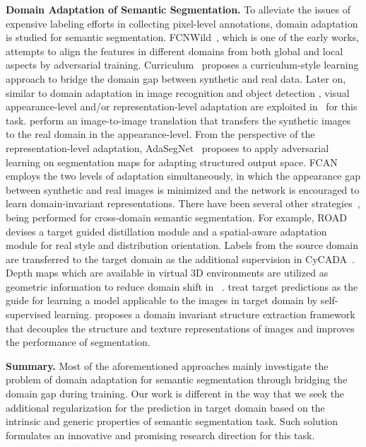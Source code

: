 \documentclass[10pt,twocolumn,letterpaper]{article}
\begin{document}
\textbf{Domain Adaptation of Semantic Segmentation.}
To alleviate the issues of expensive labeling efforts in collecting pixel-level annotations, domain adaptation is studied for semantic segmentation. FCNWild~\cite{BDDS_hoffman2016fcns}, which is one of the early works, attempts to align the features in different domains from both global and local aspects by adversarial training. Curriculum~\cite{zhang2017curriculum} proposes a curriculum-style learning approach to bridge the domain gap between synthetic and real data. Later on, similar to domain adaptation in image recognition and object detection \cite{cai2019exploring,pan2019transferrable,yao2015semi}, visual appearance-level and/or representation-level adaptation are exploited in~\cite{dundar2018domain,murez2018image,Tsai_2018_CVPR,Zhang_2018_CVPR} for this task. \cite{dundar2018domain,murez2018image} perform an image-to-image translation that transfers the synthetic images to the real domain in the appearance-level. From the perspective of the representation-level adaptation, AdaSegNet~\cite{Tsai_2018_CVPR} proposes to apply adversarial learning on segmentation maps for adapting structured output space.
FCAN~\cite{Zhang_2018_CVPR} employs the two levels of adaptation simultaneously, in which the appearance gap between synthetic and real images is minimized and the network is encouraged to learn domain-invariant representations.
There have been several other strategies~\cite{chang2019all,chen2019learning,chen2018road,pmlr-v80-hoffman18a,iqbal2019mlsl,li2019bidirectional,zou2018unsupervised}, being performed for cross-domain semantic segmentation.
For example, ROAD~\cite{chen2018road} devises a target guided distillation module and a spatial-aware adaptation module for real style and distribution orientation. Labels from the source domain are transferred to the target domain as the additional supervision in CyCADA~\cite{pmlr-v80-hoffman18a}. Depth maps which are available in virtual 3D environments are utilized as geometric information to reduce domain shift in ~\cite{chen2019learning}. \cite{iqbal2019mlsl,li2019bidirectional,zou2018unsupervised} treat target predictions as the guide for learning a model applicable to the images in target domain by self-supervised learning. \cite{chang2019all} proposes a domain invariant structure extraction framework that decouples the structure and texture representations of images and improves the performance of segmentation.

\textbf{Summary.} Most of the aforementioned approaches mainly investigate the problem of domain adaptation for semantic segmentation through bridging the domain gap during training. Our work is different in the way that we seek the additional regularization for the prediction in target domain based on the intrinsic and generic properties of semantic segmentation task. Such solution formulates an innovative and promising research direction for this task.
\end{document}
